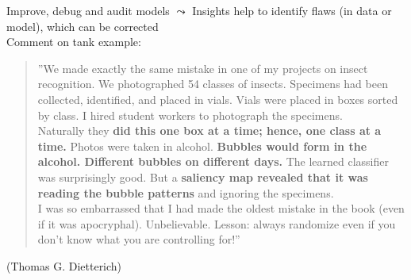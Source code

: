 \documentclass[10pt,compress,t,notes=noshow, xcolor=table]{beamer}
\begin{document}
\begin{frame}{Improve, debug and audit models}
$\leadsto$ Insights help to identify flaws (in data or model), which can be corrected \\[2ex]
	\centering
    Comment on tank example: 
    \begin{quote}
        ''We made exactly the same mistake in one of my projects on insect recognition. We photographed 54 classes of insects. Specimens had been collected, identified, and placed in vials. Vials were placed in boxes sorted by class. I hired student workers to photograph the specimens.\\[0.5ex]
        Naturally they \textbf{did this one box at a time; hence, one class at a time.} Photos were taken in alcohol. \textbf{Bubbles would form in the alcohol. Different bubbles on different days.} The learned classifier was surprisingly good. But a \textbf{saliency map revealed that it was reading the bubble patterns} and ignoring the specimens.\\[0.5ex]
        I was so embarrassed that I had made the oldest mistake in the book (even if it was apocryphal). Unbelievable.
        Lesson: always randomize even if you don’t know what you are controlling for!''
    \end{quote}
    (Thomas G. Dietterich) 
 \end{frame}
\end{document}
